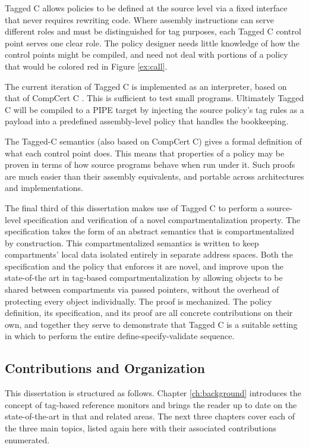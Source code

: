 \documentclass{report}
\begin{document}
Tagged C allows policies to be defined at the source level via a fixed interface
that never requires rewriting code. Where assembly instructions can serve different roles and must
be distinguished for tag purposes, each Tagged C control point serves one clear role. The policy
designer needs little knowledge of how the control points might be compiled, and need not
deal with portions of a policy that would be colored red in Figure \ref{ex:call}.

The current iteration of Tagged C is implemented as an interpreter, based on that of
CompCert C \cite{Leroy09:CompCert}. This is sufficient to test small programs. Ultimately
Tagged C will be compiled to a PIPE target by injecting the source policy's tag rules
as a payload into a predefined assembly-level policy that handles the bookkeeping.

The Tagged-C semantics (also based on CompCert C) gives a formal definition of what each
control point does. This means that properties of a policy may be proven in terms of how
source programs behave when run under it. Such proofs are much easier than their
assembly equivalents, and portable across architectures and implementations.

The final third of this dissertation makes use of Tagged C to perform a source-level specification and
verification of a novel compartmentalization property. The specification takes the form of
an abstract semantics that is compartmentalized by construction. This compartmentalized semantics
is written to keep compartments' local data isolated entirely in separate address spaces.
Both the specification and the policy that enforces it are novel, and improve upon the
state-of-the art in tag-based compartmentalization by allowing objects to be shared between
compartments via passed pointers, without the overhead of protecting every object individually.
The proof is mechanized. The policy definition, its
specification, and its proof are all concrete contributions on their own, and together they
serve to demonstrate that Tagged C is a suitable setting in which to perform the entire
define-specify-validate sequence.

\subsection{Contributions and Organization}

This dissertation is structured as follows.
Chapter \ref{ch:background} introduces the concept of tag-based reference monitors
and brings the reader up to date on the state-of-the-art in that and related areas.
The next three chapters cover each of the three main topics, listed again here with
their associated contributions enumerated.
\end{document}
